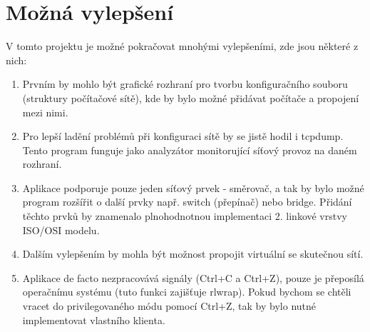 \chapter{Možná vylepšení}

V tomto projektu je možné pokračovat mnohými vylepšeními, zde jsou některé z nich:

\begin{enumerate}
\item Prvním by mohlo být grafické rozhraní pro tvorbu konfiguračního souboru (struktury počítačové sítě), kde by bylo možné přidávat počítače a propojení mezi nimi.                                                                                                                                                                     

\item Pro lepší ladění problémů při konfiguraci sítě by se jistě hodil i tcpdump. Tento program funguje jako analyzátor monitorující síťový provoz na daném rozhraní.

\item Aplikace podporuje pouze jeden síťový prvek - směrovač, a tak by bylo možné program rozšířit o další prvky např. switch (přepínač) nebo bridge. Přidání těchto prvků by znamenalo plnohodnotnou implementaci 2. linkové vrstvy ISO/OSI modelu.

\item Dalším vylepšením by mohla být možnost propojit virtuální se skutečnou sítí. 

\item Aplikace de facto nezpracovává signály (Ctrl+C a Ctrl+Z), pouze je přeposílá operačnímu systému (tuto funkci zajišťuje rlwrap). Pokud bychom se chtěli vracet do privilegovaného módu pomocí Ctrl+Z, tak by bylo nutné implementovat vlastního klienta.
\end{enumerate}







